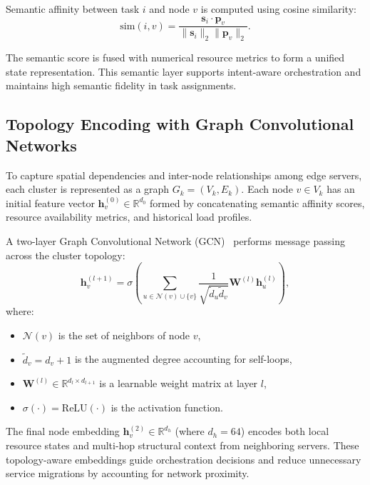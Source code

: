 Semantic affinity between task $i$ and node $v$ is computed using cosine similarity:
\begin{equation}
	\text{sim}(i,v) = \frac{\mathbf{s}_i \cdot \mathbf{p}_v}{\|\mathbf{s}_i\|_2 \|\mathbf{p}_v\|_2}.
\end{equation}

The semantic score is fused with numerical resource metrics to form a unified state representation. This semantic layer supports intent-aware orchestration and maintains high semantic fidelity in task assignments.

\subsection{Topology Encoding with Graph Convolutional Networks}
To capture spatial dependencies and inter-node relationships among edge servers, each cluster is represented as a graph $G_k = (V_k, E_k)$. Each node $v \in V_k$ has an initial feature vector $\mathbf{h}_v^{(0)} \in \mathbb{R}^{d_0}$ formed by concatenating semantic affinity scores, resource availability metrics, and historical load profiles.

A two-layer Graph Convolutional Network (GCN)~\cite{Kipf2017_GCN} performs message passing across the cluster topology:
\begin{equation}
	\mathbf{h}_v^{(l+1)} = \sigma\!\left(\sum_{u \in \mathcal{N}(v) \cup \{v\}} \frac{1}{\sqrt{\tilde{d}_u \tilde{d}_v}} \mathbf{W}^{(l)} \mathbf{h}_u^{(l)}\right),
\end{equation}
where:
\begin{itemize}
	\item $\mathcal{N}(v)$ is the set of neighbors of node $v$,
	\item $\tilde{d}_v = d_v + 1$ is the augmented degree accounting for self-loops,
	\item $\mathbf{W}^{(l)} \in \mathbb{R}^{d_l \times d_{l+1}}$ is a learnable weight matrix at layer $l$,
	\item $\sigma(\cdot) = \text{ReLU}(\cdot)$ is the activation function.
\end{itemize}

The final node embedding $\mathbf{h}_v^{(2)} \in \mathbb{R}^{d_h}$ (where $d_h = 64$) encodes both local resource states and multi-hop structural context from neighboring servers. These topology-aware embeddings guide orchestration decisions and reduce unnecessary service migrations by accounting for network proximity.

